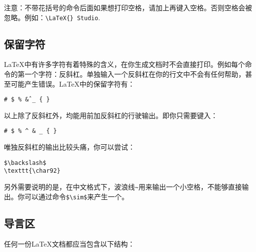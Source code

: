 注意：不带花括号的命令后面如果想打印空格，请加上再键入空格。否则空格会被忽略。例如：\verb+\LaTeX{} Studio+. 

\subsection{保留字符}

\LaTeX 中有许多字符有着特殊的含义，在你生成文档时不会直接打印。例如每个命令的第一个字符：反斜杠。单独输入一个反斜杠在你的行文中不会有任何帮助，甚至可能产生错误。\LaTeX 中的保留字符有：
\begin{center}
\texttt{\# \$ \% \^ \& \_ \{ \} }
\end{center}

以上除了反斜杠外，均能用前加反斜杠的行驶输出。即你只需要键入：
\begin{center}
\texttt{\# \$ \% \^{} \& \_
	\{ \} }
\end{center}

唯独反斜杠的输出比较头痛，你可以尝试：
\begin{verbatim}
$\backslash$
\texttt{\char92}
\end{verbatim}

另外需要说明的是，在中文格式下，波浪线{\texttt{\~}}用来输出一个小空格，不能够直接输出。你可以通过命令\verb+$\sim$+来产生一个。

\subsection{导言区}
任何一份\LaTeX{}文档都应当包含以下结构：

